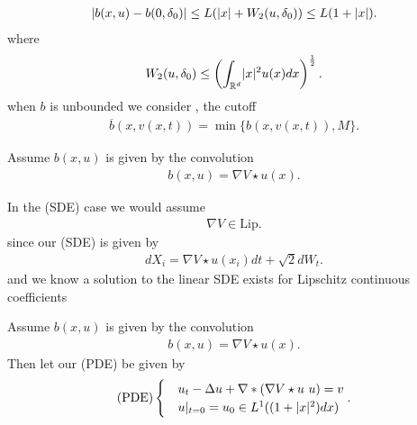 \begin{align*}
  \lvert b(x,u) - b(0,\delta_0  )\rvert \le  L(\lvert x\rvert + W_2(u,\delta_0 )) \le L(1+\lvert x\rvert)
.\end{align*}
where 
\begin{align*}
  W_2(u,\delta_0) \le  \left(\int_{\mathbb{R}^{d} } \lvert x\rvert^2 u(x) dx\right)^{\frac{1}{2}} 
.\end{align*}
when $b$ is unbounded we consider , the cutoff  
\begin{align*}
  \overline{b}(x,v(x,t))  = \min \{b(x,v(x,t)), M\}  
.\end{align*}
\begin{assumption}\label{b_special}
 Assume $b(x,u) $  is given by the convolution
 \begin{align*}
  b(x,u) = \nabla V \star u(x)
 .\end{align*}
\end{assumption}
\begin{remark}
 In the (SDE)  case we would assume 
\begin{align*}
   \nabla V \in  \text{Lip} \tag{SDE}
 .\end{align*}
 since our (SDE) is given by
 \begin{align*}
  d X_i = \nabla V \star  u(x_i) dt + \sqrt{2} dW_t
 .\end{align*}
 and we know a solution to the linear SDE exists for Lipschitz continuous coefficients 
\end{remark}
\begin{definition}\label{pde_mve_apprach}
 Assume $b(x,u) $  is given by the convolution
 \begin{align*}
  b(x,u) = \nabla V \star u(x)
 .\end{align*}
 Then let our (PDE) be given by 
 \begin{align*}
  \text{(PDE)}\begin{cases}
    &u_t - \Delta u + \nabla*(\nabla V \star  u \ u) = v\\
    &u \rvert_{t=0} = u_{0} \in  L^{1}((1+\lvert x\rvert^2)dx) 
  \end{cases}
 .\end{align*}
\end{definition}
